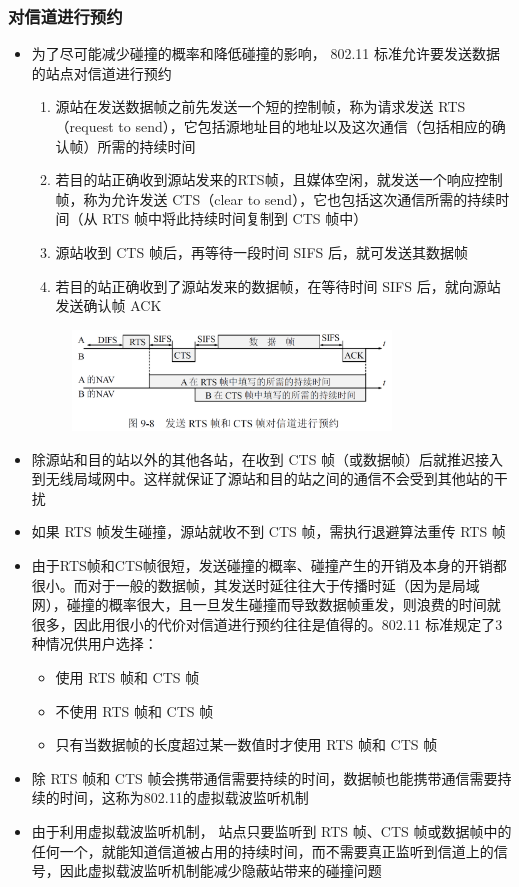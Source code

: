 \documentclass[cs4size,a4paper,10pt]{ctexart}
\begin{document}
	\subsubsection{对信道进行预约}

	\begin{itemize}
		\item 为了尽可能减少碰撞的概率和降低碰撞的影响， 802.11 标准允许要发送数据的站点对信道进行预约
		\begin{enumerate}[label=\arabic*.]
			\item 源站在发送数据帧之前先发送一个短的控制帧，称为请求发送 RTS（request to send），它包括源地址目的地址以及这次通信（包括相应的确认帧）所需的持续时间
			\item 若目的站正确收到源站发来的RTS帧，且媒体空闲，就发送一个响应控制帧，称为允许发送 CTS（clear to send），它也包括这次通信所需的持续时间（从 RTS 帧中将此持续时间复制到 CTS 帧中）
			\item 源站收到 CTS 帧后，再等待一段时间 SIFS 后，就可发送其数据帧
			\item 若目的站正确收到了源站发来的数据帧，在等待时间 SIFS 后，就向源站发送确认帧 ACK
		\end{enumerate}
		\begin{figure}[H]
			\centering
			\includegraphics[width=0.8\textwidth]{img/3.4.3.5}
		\end{figure}
		\item 除源站和目的站以外的其他各站，在收到 CTS 帧（或数据帧）后就推迟接入到无线局域网中。这样就保证了源站和目的站之间的通信不会受到其他站的干扰
		\item 如果 RTS 帧发生碰撞，源站就收不到 CTS 帧，需执行退避算法重传 RTS 帧
		\item 由于RTS帧和CTS帧很短，发送碰撞的概率、碰撞产生的开销及本身的开销都很小。而对于一般的数据帧，其发送时延往往大于传播时延（因为是局域网），碰撞的概率很大，且一旦发生碰撞而导致数据帧重发，则浪费的时间就很多，因此用很小的代价对信道进行预约往往是值得的。802.11 标准规定了3种情况供用户选择：
		\begin{itemize}
			\item 使用 RTS 帧和 CTS 帧
			\item 不使用 RTS 帧和 CTS 帧
			\item 只有当数据帧的长度超过某一数值时才使用 RTS 帧和 CTS 帧
		\end{itemize}
		\item 除 RTS 帧和 CTS 帧会携带通信需要持续的时间，数据帧也能携带通信需要持续的时间，这称为802.11的虚拟载波监听机制
		\item 由于利用虚拟载波监听机制， 站点只要监听到 RTS 帧、CTS 帧或数据帧中的任何一个，就能知道信道被占用的持续时间，而不需要真正监听到信道上的信号，因此虚拟载波监听机制能减少隐蔽站带来的碰撞问题
	\end{itemize}
\end{document}
